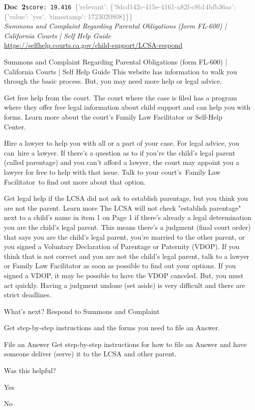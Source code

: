 \documentclass[a4paper,11pt]{article}
\begin{document}
\begin{docenv}
{\footnotesize\textcolor{doccolor}{\textbf{Doc~2}}}\hfill{\tiny\texttt{score:~19.416}}\ {\tiny\textcolor{gray}{\{'relevant': \{'9dcd142c-415e-4161-a82f-c8b14bfb36ac': \{'value': 'yes', 'timestamp': 1723020808\}\}\}}}\\[3pt]
{\small\textit{Summons and Complaint Regarding Parental Obligations (form FL-600) | California Courts | Self Help Guide}}\\[2pt]
{\tiny\url{https://selfhelp.courts.ca.gov/child-support/LCSA-respond}}\\[4pt]
{\footnotesize Summons and Complaint Regarding Parental Obligations (form FL-600) | California Courts | Self Help Guide
This website has information to walk you through the basic process. But, you may need more help or legal advice. 

Get free help from the court. The court where the case is filed has a program where they offer free legal information about child support and can help you with forms. Learn more about the court’s Family Law Facilitator or Self-Help Center.  

Hire a lawyer to help you with all or a part of your case. For legal advice, you can hire a lawyer. If there's a question as to if you're the child's legal parent (called parentage) and you can't afford a lawyer, the court may appoint you a lawyer for free to help with that issue. Talk to your court's Family Law Facilitator to find out more about that option.

Get legal help if the LCSA did not ask to establish parentage, but you think you are not the parent. Learn more
The LCSA will not check "establish parentage" next to a child's name in item 1 on Page 1 if there's already a legal determination you are the child's legal parent. This means there's a judgment (final court order) that says you are the child's legal parent, you're married to the other parent, or you signed a Voluntary Declaration of Parentage or Paternity (VDOP).
If you think that is not correct and you are not the child's legal parent, talk to a lawyer or Family Law Facilitator as soon as possible to find out your options. If you signed a VDOP, it may be possible to have the VDOP canceled. But, you must act quickly. Having a judgment undone (set aside) is very difficult and there are strict deadlines. 

What's next?
Respond to Summons and Complaint

Get step-by-step instructions and the forms you need to file an Answer.

File an Answer
 Get step-by-step instructions for how to file an Answer and have someone deliver (serve) it to the LCSA and other parent.
 

 

Was this helpful?

Yes

No}
\end{docenv}
\end{document}
